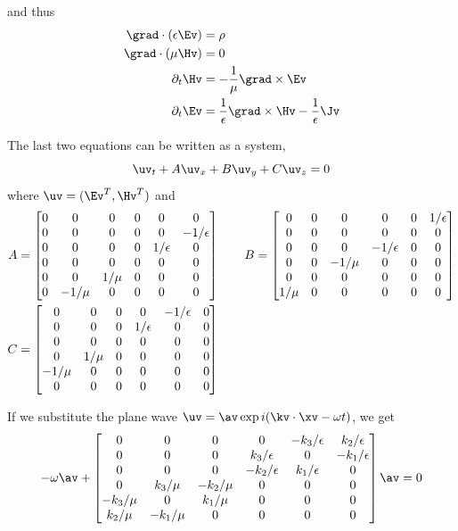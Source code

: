 \documentclass[10pt]{article}
\begin{document}
and thus
\begin{align}
  \grad\cdot(\eps\Ev) &=\rho \\
  \grad\cdot(\mu\Hv) &= 0 \\
  \partial_t \Hv &= - {1\over \mu} \grad\times\Ev \\
  \partial_t \Ev &=  {1\over \eps} \grad\times\Hv - {1\over \eps}\Jv 
\end{align}

The last two equations can be written as a system,
\[
   \uv_t + A \uv_x + B \uv_y + C \uv_z = 0
\]
where $\uv=(\Ev^T,\Hv^T)$ and
\begin{align*}
   A &= \begin{bmatrix} 
          0 & 0 & 0 & 0 & 0 & 0\\
          0 & 0 & 0 & 0 & 0 & -1/\epsilon\\
          0 & 0 & 0 & 0 & 1/\epsilon & 0\\
          0 & 0 & 0 & 0 & 0 & 0\\
          0 & 0 & 1/\mu & 0 & 0 & 0\\
          0 & -1/\mu & 0 & 0 & 0 & 0
       \end{bmatrix} \qquad
   B = \begin{bmatrix} 
          0 & 0 & 0 & 0 & 0 & 1/\epsilon\\
          0 & 0 & 0 & 0 & 0 & 0\\
          0 & 0 & 0 & -1/\epsilon & 0 & 0\\
          0 & 0 & -1/\mu & 0 & 0 & 0\\
          0 & 0 & 0 & 0 & 0 & 0\\
          1/\mu & 0 & 0 & 0 & 0 & 0
       \end{bmatrix} \\
   C &= \begin{bmatrix} 
          0 & 0 & 0 & 0 &-1/\epsilon & 0\\
          0 & 0 & 0 & 1/\epsilon & 0 & 0\\
          0 & 0 & 0 & 0 & 0 & 0\\
          0 & 1/\mu & 0 & 0 & 0 & 0\\
          -1/\mu & 0 & 0 & 0 & 0 & 0\\
          0 & 0 & 0 & 0 & 0 & 0
       \end{bmatrix}
\end{align*}

If we substitute the plane wave $\uv = \av\exp{i (\kv\cdot\xv - \omega t)}$,
we get
\[
   -\omega \av + 
            \begin{bmatrix}
          0 & 0 & 0 & 0 & -k_3/\eps & k_2/\eps\\
          0 & 0 & 0 & k_3/\eps & 0 & -k_1/\eps\\
          0 & 0 & 0 & -k_2/\eps & k_1/\eps & 0\\
          0 & k_3/\mu & -k_2/\mu & 0 & 0 & 0\\
         -k_3/\mu & 0 & k_1/\mu & 0 & 0 & 0\\
          k_2/\mu & -k_1/\mu & 0 & 0 & 0 & 0
            \end{bmatrix} 
     \av = 0
\]
\end{document}
